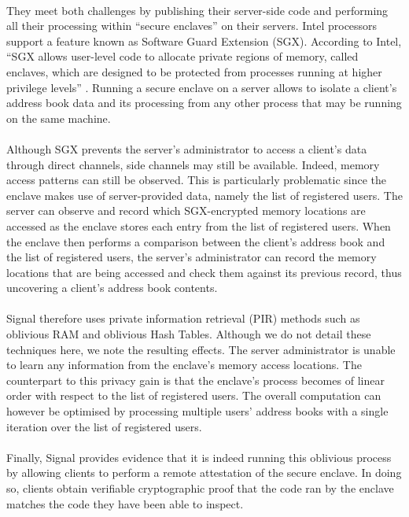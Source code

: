 \paragraph{} They meet both challenges by publishing their server-side code and performing all their processing within ``secure enclaves'' on their servers. Intel processors support a feature known as Software Guard Extension (SGX). According to Intel, ``SGX allows user-level code to allocate private regions of memory, called enclaves, which are designed to be protected from processes running at higher privilege levels'' \cite{IntelSGX}. Running a secure enclave on a server allows to isolate a client's address book data and its processing from any other process that may be running on the same machine.

\paragraph{}Although SGX prevents the server's administrator to access a client's data through direct channels, side channels may still be available. Indeed, memory access patterns can still be observed. This is particularly problematic since the enclave makes use of server-provided data, namely the list of registered users. The server can observe and record which SGX-encrypted memory locations are accessed as the enclave stores each entry from the list of registered users. When the enclave then performs a comparison between the client's address book and the list of registered users, the server's administrator can record the memory locations that are being accessed and check them against its previous record, thus uncovering a client's address book contents.

\paragraph{} Signal therefore uses private information retrieval (PIR) methods such as oblivious RAM and oblivious Hash Tables. Although we do not detail these techniques here, we note the resulting effects. The server administrator is unable to learn any information from the enclave's memory access locations. The counterpart to this privacy gain is that the enclave's process becomes of linear order with respect to the list of registered users. The overall computation can however be optimised by processing multiple users' address books with a single iteration over the list of registered users.

\paragraph{} Finally, Signal provides evidence that it is indeed running this oblivious process by allowing clients to perform a remote attestation of the secure enclave. In doing so, clients obtain verifiable cryptographic proof that the code ran by the enclave matches the code they have been able to inspect. 


